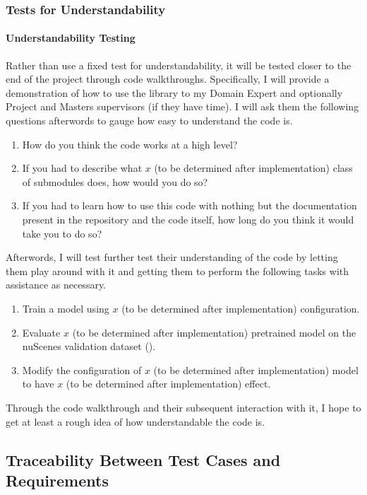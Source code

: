 \documentclass[12pt, titlepage]{article}
\begin{document}
\subsubsection{Tests for Understandability}

\paragraph{Understandability Testing}

Rather than use a fixed test for understandability, it will be tested closer to the end of the project through code walkthroughs. Specifically,
I will provide a demonstration of how to use the library to my Domain Expert and optionally Project and Masters supervisors (if they have time).
I will ask them the following questions afterwords to gauge how easy to understand the code is.
\begin{enumerate}
  \item How do you think the code works at a high level?
  \item If you had to describe what $x$ (to be determined after implementation) class of submodules does, how would you do so?
  \item If you had to learn how to use this code with nothing but the documentation present in the repository and the code itself, how long do you think it would take you to do so?
\end{enumerate}

Afterwords, I will test further test their understanding of the code by letting them play around with it and getting them to perform the following tasks with assistance as necessary.
\begin{enumerate}
  \item Train a model using $x$ (to be determined after implementation) configuration.
  \item Evaluate $x$ (to be determined after implementation) pretrained model on the nuScenes validation dataset (\cite{caesar2020nuscenes}).
  \item Modify the configuration of $x$ (to be determined after implementation) model to have $x$ (to be determined after implementation) effect.
\end{enumerate}

Through the code walkthrough and their subsequent interaction with it, I hope to get at least a rough idea of how understandable the code is.

\subsection{Traceability Between Test Cases and Requirements}
\end{document}

